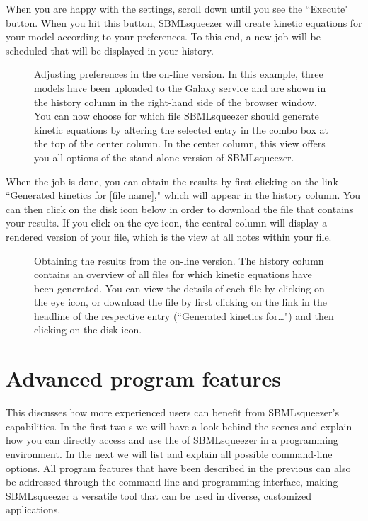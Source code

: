 When you are happy with the settings, scroll down until you see the ``Execute" button.
When you hit this button, SBMLsqueezer will create kinetic equations for your model according to your preferences.
To this end, a new job will be scheduled that will be displayed in your history.
\begin{figure}
\caption[Adjusting preferences in the on-line version]{Adjusting preferences in the on-line version.
In this example, three models have been uploaded to the Galaxy service and are shown in the history column in the right-hand side of the browser window.
You can now choose for which file SBMLsqueezer should generate kinetic equations by altering the selected entry in the combo box at the top of the center column.
In the center column, this view offers you all options of the stand-alone version of SBMLsqueezer.}
\label{fig:WebserviceConfiguration}
\end{figure}

When the job is done, you can obtain the results by first clicking on the link ``Generated kinetics for [file name]," which will appear in the history column.
You can then click on the disk icon below in order to download the \SBML file that contains your results.
If you click on the eye icon, the central column will display a rendered version of your \SBML file, which is the view at all \XHTML notes within your file.
\begin{figure}
\caption[Obtaining the results from the on-line version]{Obtaining the results from the on-line version.
The history column contains an overview of all files for which kinetic equations have been generated.
You can view the details of each file by clicking on the eye icon, or download the file by first clicking on the link in the headline of the respective entry (``Generated kinetics for\ldots") and then clicking on the disk icon.}
\label{fig:WebserviceResult}
\end{figure}

\chapter{Advanced program features}
\label{chap:AdvancedFeatures}

This  discusses how more experienced users can benefit from SBMLsqueezer's capabilities.
In the first two s we will have a look behind the scenes and explain how you can directly access and use the \API of SBMLsqueezer in a programming environment.
In the next  we will list and explain all possible command-line options.
All program features that have been described in the previous  can also be addressed through the command-line and programming interface, making SBMLsqueezer a versatile tool that can be used in diverse, customized applications.


